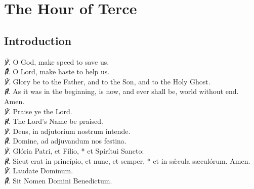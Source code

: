 \section{The Hour of Terce}
\subsection{Introduction}
\englat
{
\textit{\scshape ℣.} O God, {} make speed to save us.\\
\textit{\scshape ℟.} O Lord, make haste to help us.\\
\textit{\scshape ℣.} Glory be to the Father, and to the Son, and to the Holy Ghost.\\
\textit{\scshape ℟.} As it was in the beginning, is now, and ever shall be, world without end. Amen.\\
\textit{\scshape ℣.} Praise ye the Lord.\\
\textit{\scshape ℟.} The Lord's Name be praised.\\
}
{
\textit{\scshape ℣.} Deus, {} in adjutorium nostrum intende.\\
\textit{\scshape ℟.} Domine, ad adjuvandum nos festina.\\
\textit{\scshape ℣.} Glória Patri, et Fílio, * et Spirítui Sancto:\\
\textit{\scshape ℟.} Sicut erat in princípio, et nunc, et semper, * et in sǽcula s{\ae}culórum. Amen.\\
\textit{\scshape ℣.} Laudate Dominum.\\
\textit{\scshape ℟.} Sit Nomen Domini Benedictum.\\
}
